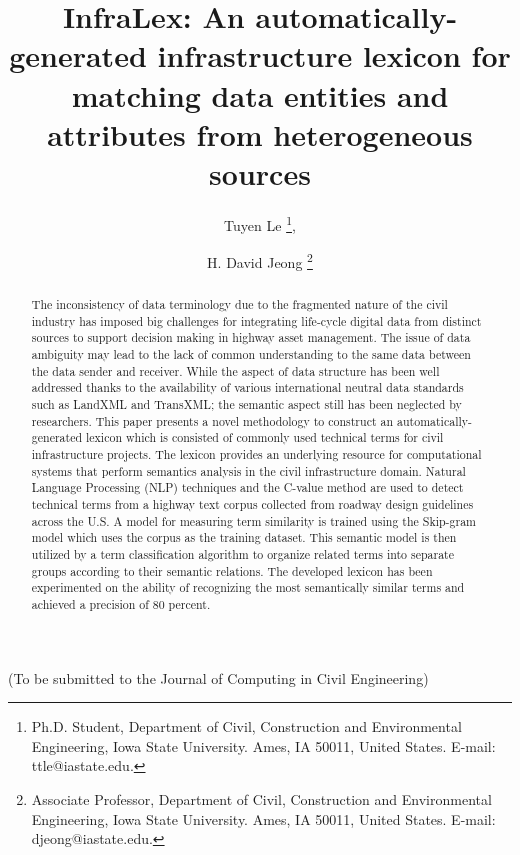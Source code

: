 \documentclass[Journal, InsideFigs, DoubleSpace]{ascelike} %
\begin{document}
\title{InfraLex: An automatically-generated infrastructure lexicon for matching data entities and attributes from heterogeneous sources}
%
\author{
Tuyen Le
\thanks{
Ph.D. Student, Department of Civil, Construction and Environmental Engineering, Iowa State University. Ames, IA 50011, United States. E-mail: ttle@iastate.edu.},
\and
H. David Jeong
\thanks{Associate Professor, Department of Civil, Construction and Environmental Engineering, Iowa State University. Ames, IA 50011, United States. E-mail: djeong@iastate.edu.}
 }

\maketitle
%
\begin{center}
(To be submitted to the Journal of Computing in Civil Engineering) 
\end{center}

\begin{abstract} %
The inconsistency of data terminology due to the fragmented nature of the civil industry has imposed big challenges for integrating life-cycle digital data from distinct sources to support decision making in highway asset management. The issue of data ambiguity may lead to the lack of common understanding to the same data between the data sender and receiver. While the aspect of data structure has been well addressed thanks to the availability of various international neutral data standards such as LandXML and TransXML;  the semantic aspect still has been neglected by researchers. 
This paper presents a novel methodology to construct an automatically-generated lexicon which is consisted of commonly used technical terms for civil infrastructure projects. The lexicon provides an underlying resource for computational systems that perform semantics analysis in the civil infrastructure domain.
Natural Language Processing (NLP) techniques and the C-value method are used to detect technical terms from a highway text corpus collected from roadway design guidelines across the U.S. A model for measuring term similarity is trained using the Skip-gram model which uses the corpus as the training dataset. This semantic model is then utilized by a term classification algorithm to organize related terms into separate groups according to their semantic relations.
The developed lexicon has been experimented on the ability of recognizing the most semantically similar terms and achieved a precision of 80 percent. 
  
\end{abstract}
\end{document}
